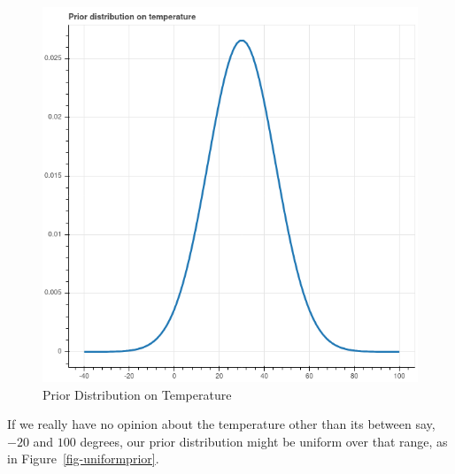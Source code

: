 \documentclass[
  11pt,
  letterpaper,
]{scrbook}
\theoremstyle{plain}
\theoremstyle{plain}
\theoremstyle{remark}
\begin{document}
\begin{figure}

{\centering \includegraphics{chapters/img/prior.png}

}

\caption{\label{fig-tempprior}Prior Distribution on Temperature}

\end{figure}

If we really have no opinion about the temperature other than its
between say, \(-20\) and \(100\) degrees, our prior distribution might
be uniform over that range, as in Figure~\ref{fig-uniformprior}.
\end{document}

